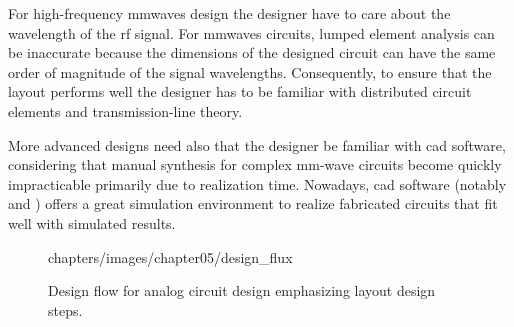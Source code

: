 For high-frequency \gls{mmwaves} design the designer have to care about the wavelength of the \gls{rf} signal. For \gls{mmwaves} circuits, lumped element analysis can be inaccurate because the dimensions of the designed circuit can have the same order of magnitude of the signal wavelengths. Consequently, to ensure that the layout performs well the designer has to be familiar with distributed circuit elements and transmission-line theory. 

More advanced designs need also that the designer be familiar with \gls{cad} software, considering that manual synthesis for complex mm-wave circuits become quickly impracticable primarily due to realization time. Nowadays, \gls{cad} software (notably \cadence \virtuoso and \keysight \ads) offers a great simulation environment to realize fabricated circuits that fit well with simulated results.

\begin{figure}%
\centering
	\begin{overpic}[scale=1]{chapters/images/chapter05/design_flux}
	\end{overpic}
\caption{Design flow for analog circuit design emphasizing layout design steps.}
\label{fig-design_flux}
\end{figure}

